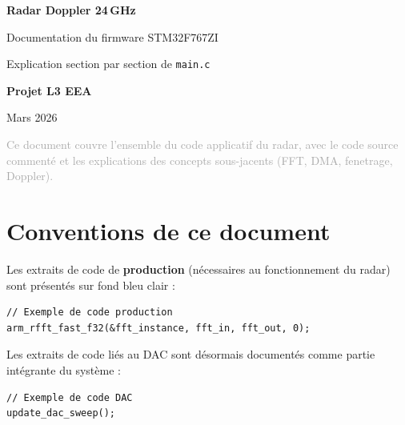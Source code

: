 \documentclass[a4paper,11pt]{article}
\begin{document}
\begin{titlepage}
\centering
\vspace*{4cm}
{\Huge\bfseries\color{sectionblue} Radar Doppler 24\,GHz\par}
\vspace{0.8cm}
{\Large Documentation du firmware STM32F767ZI\par}
\vspace{0.4cm}
{\large Explication section par section de \texttt{main.c}\par}
\vspace{2cm}
{\large\bfseries Projet L3 EEA\par}
\vspace{0.5cm}
{\large Mars 2026\par}
\vfill
\textcolor{darkgray}{\small Ce document couvre l'ensemble du code applicatif du radar, avec le code source
comment\'e et les explications des concepts sous-jacents (FFT, DMA, fenetrage, Doppler).}
\end{titlepage}

\tableofcontents
\newpage

\section{Conventions de ce document}

Les extraits de code de \textbf{production} (n\'ecessaires au fonctionnement du radar) sont pr\'esent\'es sur fond bleu clair :

\begin{lstlisting}[style=cstyle,numbers=none]
// Exemple de code production
arm_rfft_fast_f32(&fft_instance, fft_in, fft_out, 0);
\end{lstlisting}

Les extraits de code li\'es au DAC sont d\'esormais document\'es comme partie int\'egrante du syst\`eme :

\begin{lstlisting}[style=cstyle,numbers=none]
// Exemple de code DAC
update_dac_sweep();
\end{lstlisting}

\newpage

\end{document}
